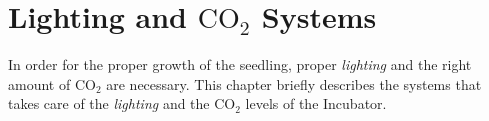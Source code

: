\documentclass[../main]{subfiles}
\begin{document}
\chapter{Lighting and $\mbox{CO}_2$ Systems} \label{chp:}

In order for the proper growth of the seedling, proper \emph{lighting} and the
right amount of $\mbox{CO}_2$ are necessary. This chapter briefly describes the
systems that takes care of the \emph{lighting} and the $\mbox{CO}_2$ levels
of the Incubator.





% 
\end{document}
